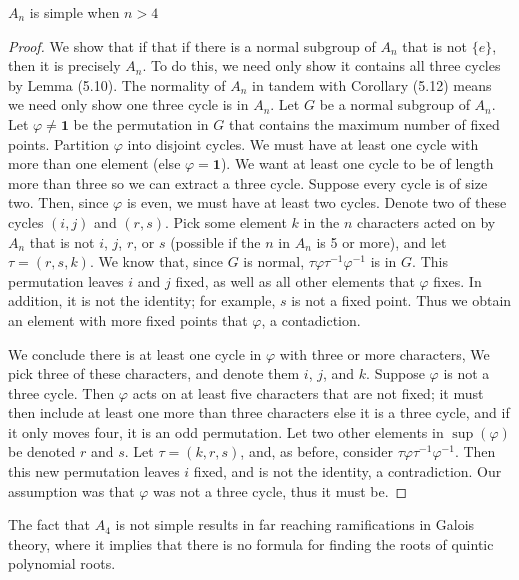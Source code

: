 \begin{lemma} $A_n$ is simple when $n > 4$ \end{lemma}
\begin{proof} We show that if that if there is a normal subgroup of $A_n$ that is not $\{ e \}$, then it is precisely $A_n$. To do this, we need only show it contains all three cycles by Lemma (5.10). The normality of $A_n$ in tandem with Corollary (5.12) means we need only show one three cycle is in $A_n$. Let $G$ be a normal subgroup of $A_n$. Let $\varphi \neq \mathbf{1}$ be the permutation in $G$ that contains the maximum number of fixed points. Partition $\varphi$ into disjoint cycles. We must have at least one cycle with more than one element (else $\varphi = \mathbf{1}$). We want at least one cycle to be of length more than three so we can extract a three cycle. Suppose every cycle is of size two. Then, since $\varphi$ is even, we must have at least two cycles. Denote two of these cycles $(i, j)$ and $(r, s)$. Pick some element $k$ in the $n$ characters acted on by $A_n$ that is not $i$, $j$, $r$, or $s$ (possible if the $n$ in $A_n$ is 5 or more), and let $\tau = (r, s, k)$. We know that, since $G$ is normal, $\tau \varphi \tau^{-1} \varphi^{-1}$ is in $G$. This permutation leaves $i$ and $j$ fixed, as well as all other elements that $\varphi$ fixes. In addition, it is not the identity; for example, $s$ is not a fixed point. Thus we obtain an element with more fixed points that $\varphi$, a contadiction.

We conclude there is at least one cycle in $\varphi$ with three or more characters, We pick three of these characters, and denote them $i$, $j$, and $k$. Suppose $\varphi$ is not a three cycle. Then $\varphi$ acts on at least five characters that are not fixed; it must then include at least one more than three characters else it is a three cycle, and if it only moves four, it is an odd permutation. Let two other elements in $\sup(\varphi)$ be denoted $r$ and $s$. Let $\tau = (k, r, s)$, and, as before, consider $\tau \varphi \tau^{-1} \varphi^{-1}$. Then this new permutation leaves $i$ fixed, and is not the identity, a contradiction. Our assumption was that $\varphi$ was not a three cycle, thus it must be.
\end{proof}

The fact that $A_4$ is not simple results in far reaching ramifications in Galois theory, where it implies that there is no formula for finding the roots of quintic polynomial roots.

\clearpage

